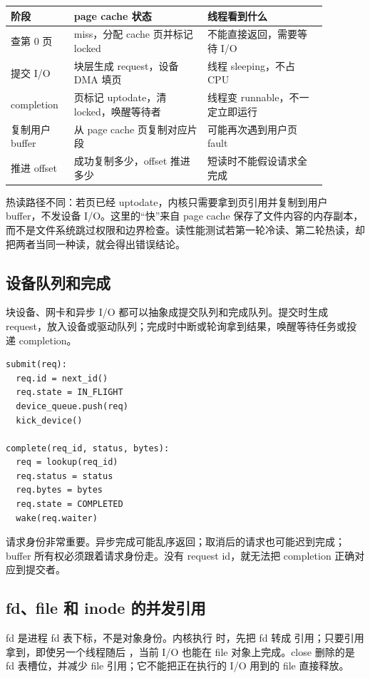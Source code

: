 \begin{longtable}{|p{0.16\linewidth}|p{0.38\linewidth}|p{0.34\linewidth}|}
\toprule
阶段 & page cache 状态 & 线程看到什么 \\
\midrule
查第 0 页 & miss，分配 cache 页并标记 locked & 不能直接返回，需要等待 I/O \\\tablerowrule
提交 I/O & 块层生成 request，设备 DMA 填页 & 线程 sleeping，不占 CPU \\\tablerowrule
completion & 页标记 uptodate，清 locked，唤醒等待者 & 线程变 runnable，不一定立即运行 \\\tablerowrule
复制用户 buffer & 从 page cache 页复制对应片段 & 可能再次遇到用户页 fault \\\tablerowrule
推进 offset & 成功复制多少，offset 推进多少 & 短读时不能假设请求全完成 \\
\bottomrule
\end{longtable}

热读路径不同：若页已经 uptodate，内核只需要拿到页引用并复制到用户 buffer，不发设备 I/O。这里的“快”来自 page cache 保存了文件内容的内存副本，而不是文件系统跳过权限和边界检查。读性能测试若第一轮冷读、第二轮热读，却把两者当同一种读，就会得出错误结论。

\subsection{设备队列和完成}

块设备、网卡和异步 I/O 都可以抽象成提交队列和完成队列。提交时生成 request，放入设备或驱动队列；完成时中断或轮询拿到结果，唤醒等待任务或投递 completion。

\begin{lstlisting}
submit(req):
  req.id = next_id()
  req.state = IN_FLIGHT
  device_queue.push(req)
  kick_device()

complete(req_id, status, bytes):
  req = lookup(req_id)
  req.status = status
  req.bytes = bytes
  req.state = COMPLETED
  wake(req.waiter)
\end{lstlisting}

请求身份非常重要。异步完成可能乱序返回；取消后的请求也可能迟到完成；buffer 所有权必须跟着请求身份走。没有 request id，就无法把 completion 正确对应到提交者。

\subsection{fd、file 和 inode 的并发引用}

fd 是进程 fd 表下标，不是对象身份。内核执行  时，先把 fd 转成  引用；只要引用拿到，即使另一个线程随后 ，当前 I/O 也能在 file 对象上完成。close 删除的是 fd 表槽位，并减少 file 引用；它不能把正在执行的 I/O 用到的 file 直接释放。

